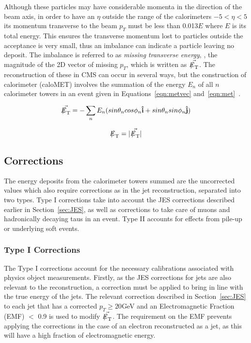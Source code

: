 Although these particles may have considerable momenta in the direction of the beam axis, in order to have an $\eta$ outside the range of the calorimeters $ -5 < \eta < 5$ its momentum transverse to the beam $p_{T}$ must be less than 0.013$E$ where $E$ is its total energy. This ensures the transverse momentum lost to particles outside the acceptance is very small, thus an imbalance can indicate a particle leaving no deposit. The imbalance is referred to as \textit{missing transverse energy}, \met, the magnitude of the 2D vector of missing $p_{T}$, which is written as $\vec{\met}$. The reconstruction of these in CMS can occur in several ways, but the construction of calorimeter \met  (caloMET) involves the summation of the energy $E_{n}$ of all $n$ calorimeter towers in an event given in Equations~\ref{eqn:metvec} and~\ref{eqn:met}~\cite{metrecon}. 

\begin{equation}
\vec{\met} = - \sum_{n} E_{n} (sin \theta_{n} cos \phi_{n} \mathbf{\hat{i}} + sin \theta_{n} sin \phi_{n}  \mathbf{\hat{j}})
\label{eqn:metvec}
\end{equation}

\begin{equation}
\met = | \vec{\met} | 
\label{eqn:met}
\end{equation}

\subsection{\met Corrections}

The energy deposits from the calorimeter towers summed are the uncorrected values which also require corrections as in the jet reconstruction, separated into two types. Type I corrections take into account the JES  corrections described earlier in Section~\ref{sec:JES}, as well as corrections to take care of muons and hadronically decaying taus in an event. Type II  accounts for effects from pile-up or underlying soft events.
 
\subsubsection{Type I Corrections}
The Type I corrections account for the necessary calibrations associated with physics object measurements. Firstly, as the JES corrections for jets are also relevant to the \met reconstruction, a correction must be applied to bring \met in line with the true energy of the jets. The relevant correction described in Section~\ref{sec:JES} to each jet that has a corrected $p_{T} \geq 20 $GeV and an Electromagnetic Fraction (EMF) $<$ 0.9 is used to modify $\vec{\met}$. The requirement on the EMF prevents applying the corrections in the case of an electron reconstructed as a jet, as this will have a high fraction of electromagnetic  energy.

